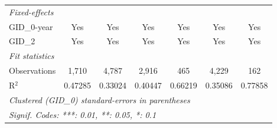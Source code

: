 \begin{table}[H]
\begin{tabular}{lcccccc}
      \midrule
      \emph{Fixed-effects}\\
      GID\_0-year        & Yes                    & Yes                          & Yes                     & Yes                            & Yes                     & Yes\\  
      GID\_2             & Yes                    & Yes                          & Yes                     & Yes                            & Yes                     & Yes\\  
      \midrule
      \emph{Fit statistics}\\
      Observations       & 1,710                  & 4,787                        & 2,916                   & 465                            & 4,229                   & 162\\  
      R$^2$              & 0.47285                & 0.33024                      & 0.40447                 & 0.66219                        & 0.35086                 & 0.77858\\  
      \midrule \midrule
      \multicolumn{7}{l}{\emph{Clustered (GID\_0) standard-errors in parentheses}}\\
      \multicolumn{7}{l}{\emph{Signif. Codes: ***: 0.01, **: 0.05, *: 0.1}}\\
   \end{tabular}
\end{table}



